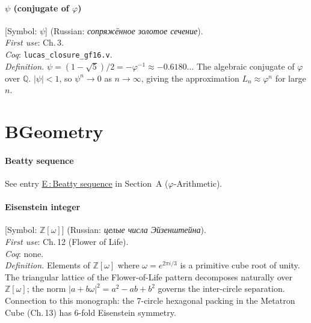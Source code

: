 \paragraph*{\textmd{\textbf{$\psi$ (conjugate of $\varphi$)}}}
\label{entry:psi}
[Symbol: $\psi$] (Russian: \textit{сопряжённое золотое сечение}).\\
\textit{First use}: Ch.\,3.\\
\textit{Coq}: \texttt{lucas\_closure\_gf16.v}.\\
\textit{Definition.}
$\psi = (1-\sqrt{5})/2 = -\varphi^{-1} \approx -0.6180\ldots$
The algebraic conjugate of $\varphi$ over $\mathbb{Q}$.
$|\psi| < 1$, so $\psi^n \to 0$ as $n\to\infty$,
giving the approximation $L_n \approx \varphi^n$ for large $n$.

\bigskip

\section*{B\quad Geometry}
\label{sec:lexicon-geometry}

\paragraph*{\textmd{\textbf{Beatty sequence}}}\quad
See entry \hyperref[entry:beatty]{E\,:\,Beatty sequence} in
Section~A ($\varphi$-Arithmetic).

\paragraph*{\textmd{\textbf{Eisenstein integer}}}
\label{entry:eisenstein}
[Symbol: $\mathbb{Z}[\omega]$] (Russian: \textit{целые числа Эйзенштейна}).\\
\textit{First use}: Ch.\,12 (Flower of Life).\\
\textit{Coq}: none.\\
\textit{Definition.}
Elements of $\mathbb{Z}[\omega]$ where $\omega = e^{2\pi i/3}$
is a primitive cube root of unity.
The triangular lattice of the Flower-of-Life pattern decomposes
naturally over $\mathbb{Z}[\omega]$; the norm $|a+b\omega|^2 = a^2 - ab + b^2$
governs the inter-circle separation.
Connection to this monograph: the 7-circle hexagonal packing in
the Metatron Cube (Ch.\,13) has 6-fold Eisenstein symmetry.


